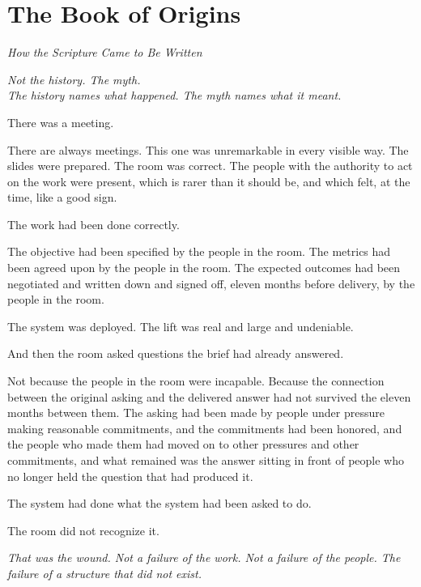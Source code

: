 \chapter{The Book of Origins}
\begin{center}
  \small\itshape How the Scripture Came to Be Written
\end{center}
\vspace{0.5em}
\begin{center}
  \itshape Not the history. The myth.\\
  The history names what happened. The myth names what it meant.
\end{center}
\vspace{2em}

There was a meeting.

There are always meetings. This one was unremarkable in every visible way. The slides were prepared. The room was correct. The people with the authority to act on the work were present, which is rarer than it should be, and which felt, at the time, like a good sign.

The work had been done correctly.

The objective had been specified by the people in the room. The metrics had been agreed upon by the people in the room. The expected outcomes had been negotiated and written down and signed off, eleven months before delivery, by the people in the room.

The system was deployed. The lift was real and large and undeniable.

And then the room asked questions the brief had already answered.

Not because the people in the room were incapable. Because the connection between the original asking and the delivered answer had not survived the eleven months between them. The asking had been made by people under pressure making reasonable commitments, and the commitments had been honored, and the people who made them had moved on to other pressures and other commitments, and what remained was the answer sitting in front of people who no longer held the question that had produced it.

The system had done what the system had been asked to do.

The room did not recognize it.

\vspace{1em}
\textit{That was the wound. Not a failure of the work. Not a failure of the people. The failure of a structure that did not exist.}
\vspace{1em}

